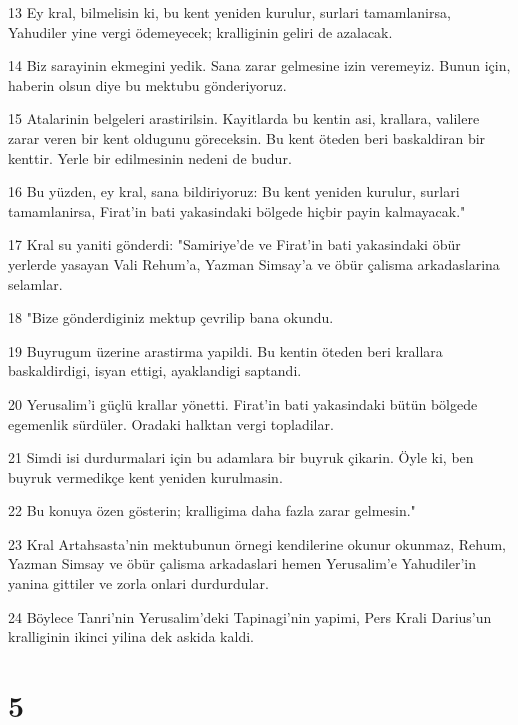 \par 13 Ey kral, bilmelisin ki, bu kent yeniden kurulur, surlari tamamlanirsa, Yahudiler yine vergi ödemeyecek; kralliginin geliri de azalacak.
\par 14 Biz sarayinin ekmegini yedik. Sana zarar gelmesine izin veremeyiz. Bunun için, haberin olsun diye bu mektubu gönderiyoruz.
\par 15 Atalarinin belgeleri arastirilsin. Kayitlarda bu kentin asi, krallara, valilere zarar veren bir kent oldugunu göreceksin. Bu kent öteden beri baskaldiran bir kenttir. Yerle bir edilmesinin nedeni de budur.
\par 16 Bu yüzden, ey kral, sana bildiriyoruz: Bu kent yeniden kurulur, surlari tamamlanirsa, Firat'in bati yakasindaki bölgede hiçbir payin kalmayacak."
\par 17 Kral su yaniti gönderdi: "Samiriye'de ve Firat'in bati yakasindaki öbür yerlerde yasayan Vali Rehum'a, Yazman Simsay'a ve öbür çalisma arkadaslarina selamlar.
\par 18 "Bize gönderdiginiz mektup çevrilip bana okundu.
\par 19 Buyrugum üzerine arastirma yapildi. Bu kentin öteden beri krallara baskaldirdigi, isyan ettigi, ayaklandigi saptandi.
\par 20 Yerusalim'i güçlü krallar yönetti. Firat'in bati yakasindaki bütün bölgede egemenlik sürdüler. Oradaki halktan vergi topladilar.
\par 21 Simdi isi durdurmalari için bu adamlara bir buyruk çikarin. Öyle ki, ben buyruk vermedikçe kent yeniden kurulmasin.
\par 22 Bu konuya özen gösterin; kralligima daha fazla zarar gelmesin."
\par 23 Kral Artahsasta'nin mektubunun örnegi kendilerine okunur okunmaz, Rehum, Yazman Simsay ve öbür çalisma arkadaslari hemen Yerusalim'e Yahudiler'in yanina gittiler ve zorla onlari durdurdular.
\par 24 Böylece Tanri'nin Yerusalim'deki Tapinagi'nin yapimi, Pers Krali Darius'un kralliginin ikinci yilina dek askida kaldi.

\chapter{5}

